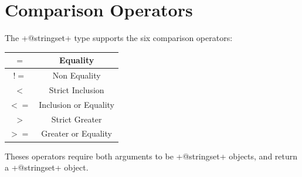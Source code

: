 \section{Comparison Operators}

The \ggsq+@stringset+ type supports the six comparison operators:\newline

\begin{tabular}{|c|c|}
\hline
$=$ & Equality \\
\hline
$!=$ & Non Equality \\
\hline
$<$  & Strict Inclusion \\
\hline
$<=$  & Inclusion or Equality \\
\hline
$>$  & Strict Greater \\
\hline
$>=$  & Greater or Equality \\
\hline
\end{tabular}

Theses operators require both arguments to be \ggsq+@stringset+ objects, and return a \ggsq+@stringset+ object.


